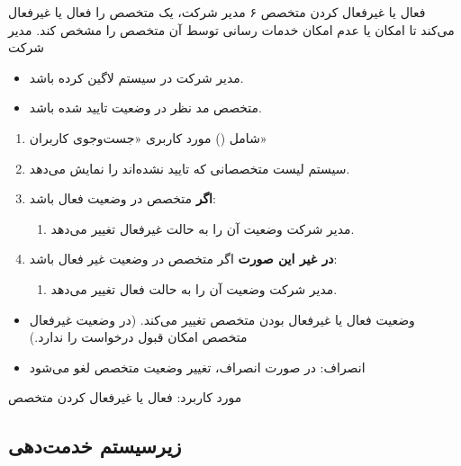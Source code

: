 \usecase
{فعال یا غیرفعال کردن متخصص}
{۶}
{مدیر شرکت، یک متخصص را فعال یا غیرفعال می‌کند تا امکان یا عدم امکان خدمات رسانی توسط آن متخصص را مشخص کند.}
{مدیر شرکت}
{}
{
\begin{itemize}
	\item 
	مدیر شرکت در سیستم لاگین کرده باشد.
	
	\item
	متخصص مد نظر در وضعیت تایید شده باشد.
\end{itemize}
}
{
\begin{enumerate}
	\item 
	شامل () مورد کاربری «جست‌وجوی کاربران»
	\item
	سیستم لیست متخصصانی که تایید نشده‌اند را نمایش می‌دهد.
	
	\item
	\textbf{اگر} متخصص در وضعیت فعال باشد:
	\begin{enumerate}
		\item 
		مدیر شرکت وضعیت آن را به حالت غیرفعال تغییر می‌دهد.
	\end{enumerate}

\item
	\textbf{در غیر این صورت } اگر متخصص در وضعیت غیر فعال باشد:
\begin{enumerate}[label=\theenumi.\arabic*.]
	\item 
	مدیر شرکت وضعیت آن را به حالت فعال تغییر می‌دهد.
\end{enumerate}
\end{enumerate}
}
{\begin{itemize}
		\item وضعیت فعال یا غیرفعال بودن متخصص تغییر می‌کند. (در وضعیت غیرفعال متخصص امکان قبول درخواست را ندارد.)
\end{itemize}}
{
\begin{itemize}
	\item انصراف: در صورت انصراف، تغییر وضعیت متخصص لغو می‌شود
\end{itemize}
}
{مورد کاربرد: فعال یا غیرفعال کردن متخصص}



\subsection{زیرسیستم خدمت‌دهی}


